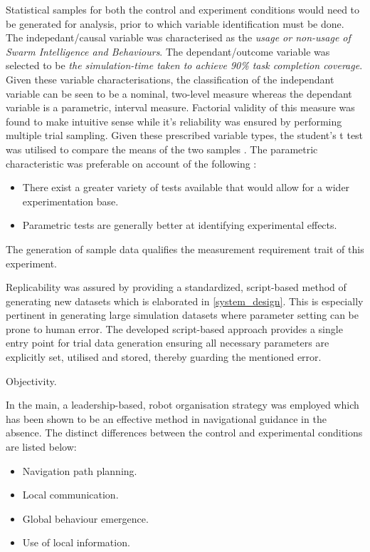 \documentclass{report}
\begin{document}
Statistical samples for both the control and experiment conditions would need to be generated for analysis, prior to which variable identification must be done. The indepedant/causal variable was characterised as the \textit{usage or non-usage of Swarm Intelligence and Behaviours}. The dependant/outcome variable was selected to be \textit{the simulation-time taken to achieve 90\% task completion coverage}. Given these variable characterisations, the classification of the independant variable can be seen to be a nominal, two-level measure whereas the dependant variable is a parametric, interval measure. Factorial validity of this measure was found to make intuitive sense \cite{Field2012} while it's reliability was ensured by performing multiple trial sampling. Given these prescribed variable types, the student's t test was utilised to compare the means of the two samples \cite{Donald2008}. The parametric characteristic was preferable on account of the following \cite{Field2012}:
\begin{itemize}
	\item There exist a greater variety of tests available that would allow for a wider experimentation base.
	\item Parametric tests are generally better at identifying experimental effects.
\end{itemize}
The generation of sample data qualifies the measurement requirement trait of this experiment.

Replicability was assured by providing a standardized, script-based method of generating new datasets which is elaborated in \ref{system_design}. This is especially pertinent in generating large simulation datasets where parameter setting can be prone to human error. The developed script-based approach provides a single entry point for trial data generation ensuring all necessary parameters are explicitly set, utilised and stored, thereby guarding the mentioned error.

Objectivity.

In the main, a leadership-based, robot organisation strategy was employed which has been shown \cite{Dyer2008} to be an effective method in navigational guidance in the absence. The distinct differences between the control and experimental conditions are listed below:
\begin{itemize}
	\item Navigation path planning.
	\item Local communication.
	\item Global behaviour emergence.
	\item Use of local information.
\end{itemize}
\end{document}
